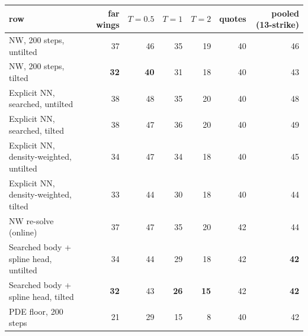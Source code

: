 \begin{tabular}{l rrrrrr}
\toprule
row & far wings & $T{=}0.5$ & $T{=}1$ & $T{=}2$ & quotes & pooled (13-strike)\\
\midrule
NW, 200 steps, untilted & 37 & 46 & 35 & 19 & 40 & 46\\
NW, 200 steps, tilted & \textbf{32} & \textbf{40} & 31 & 18 & 40 & 43\\
Explicit NN, searched, untilted & 38 & 48 & 35 & 20 & 40 & 48\\
Explicit NN, searched, tilted & 38 & 47 & 36 & 20 & 40 & 49\\
Explicit NN, density-weighted, untilted & 34 & 47 & 34 & 18 & 40 & 45\\
Explicit NN, density-weighted, tilted & 33 & 44 & 30 & 18 & 40 & 44\\
NW re-solve (online) & 37 & 47 & 35 & 20 & 42 & 44\\
Searched body + spline head, untilted & 34 & 44 & 29 & 18 & 42 & \textbf{42}\\
Searched body + spline head, tilted & \textbf{32} & 43 & \textbf{26} & \textbf{15} & 42 & \textbf{42}\\
PDE floor, 200 steps & 21 & 29 & 15 & 8 & 40 & 42\\
\bottomrule
\end{tabular}

